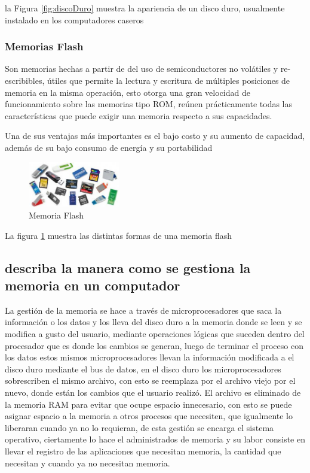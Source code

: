 \documentclass{article}
\begin{document}
        la Figura \ref{fig:discoDuro} muestra la apariencia de un disco duro, usualmente instalado en los computadores caseros 
        
        \subsubsection{Memorias Flash}
        Son memorias hechas a partir de del uso de semiconductores no volátiles y re-escribibles, útiles que permite la lectura y escritura de múltiples posiciones de memoria en la misma operación, esto otorga una gran velocidad de funcionamiento sobre las memorias tipo ROM, reúnen prácticamente todas las características que puede exigir una memoria respecto a sus capacidades.\cite{cecilio}
        
        Una de sus ventajas más importantes es el bajo costo y su aumento de capacidad, además de su bajo consumo de energía y su portabilidad 
        
        \begin{figure}[h]
        \includegraphics[width=4cm]{flash.jpg}
        \centering
        \caption{Memoria Flash}
        \label{fig:flash}
        \end{figure}
        
        La figura \ref{fig:flash} muestra las distintas formas de una memoria flash
    
    \subsection{describa la manera como se gestiona la memoria en un computador}
    La gestión de la memoria se hace a través de microprocesadores que saca la información o los datos y los lleva del disco duro a la memoria donde se  leen y se modifica a gusto del usuario, mediante operaciones lógicas que suceden dentro del procesador que es donde los cambios se generan, luego de terminar el proceso con los datos estos mismos microprocesadores llevan la información modificada a el disco duro mediante el bus de datos, en el disco duro los microprocesadores sobrescriben el mismo archivo, con esto se reemplaza por el archivo viejo por el nuevo, donde están los cambios que el usuario realizó. 
    El archivo es eliminado de la memoria RAM para evitar que ocupe espacio innecesario, con esto se puede asignar espacio a la memoria a otros procesos que necesiten, que igualmente lo liberaran cuando ya no lo requieran, de esta gestión se encarga el sistema operativo, ciertamente lo hace el administrados de memoria y su labor consiste en llevar el registro de las aplicaciones que necesitan memoria, la cantidad que necesitan y cuando ya no necesitan memoria.\cite{gestion}
 
\end{document}
